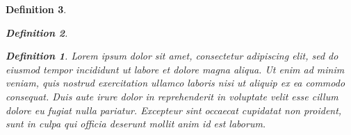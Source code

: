 \documentclass{article}
\newtheorem{definition}{Definition}
\begin{document}
\begin{definition}
  \begin{definition}
    \begin{definition}
      Lorem ipsum dolor sit amet, consectetur adipiscing elit, sed do
      eiusmod tempor incididunt ut labore et dolore magna aliqua. Ut
      enim ad minim veniam, quis nostrud exercitation ullamco laboris
      nisi ut aliquip ex ea commodo consequat. Duis aute irure dolor
      in reprehenderit in voluptate velit esse cillum dolore eu fugiat
      nulla pariatur. Excepteur sint occaecat cupidatat non proident,
      sunt in culpa qui officia deserunt mollit anim id est laborum.
    \end{definition}
  \end{definition}
\end{definition}
\end{document}
